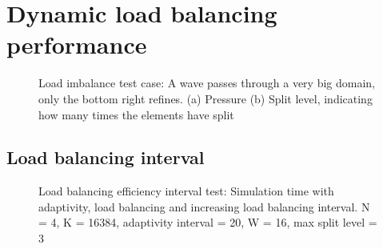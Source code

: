 \section{Dynamic load balancing performance} \label{section:results:load_balancing_performance}

\begin{figure}[H]
	\centering
	\hfill
	\caption{Load imbalance test case: A wave passes through a very big domain, only the bottom right refines. (a) Pressure (b) Split level, indicating how many times the elements have split}
	\label{fig:load_imbalance_case}
\end{figure}


\subsection{Load balancing interval} \label{section:results:load_balancing_performance:interval}

\begin{figure}[H]
	\centering
	
	\caption{Load balancing efficiency interval test: Simulation time with adaptivity, load balancing and increasing load balancing interval. N = 4, K = 16384, adaptivity interval = 20, W = 16, max split level = 3}
	\label{fig:load_balancing_efficiency_interval}
\end{figure}

